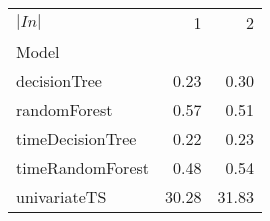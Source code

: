 \begin{tabular}{lrr}
\toprule
$|In|$ & 1 & 2 \\
Model &  &  \\
\midrule
decisionTree & 0.23 & 0.30 \\
randomForest & 0.57 & 0.51 \\
timeDecisionTree & 0.22 & 0.23 \\
timeRandomForest & 0.48 & 0.54 \\
univariateTS & 30.28 & 31.83 \\
\bottomrule
\end{tabular}
